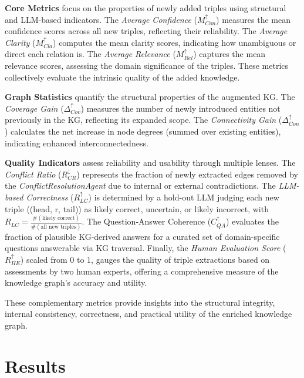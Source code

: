 \documentclass{article}
\begin{document}
\noindent\textbf{Core Metrics} focus on the properties of newly added triples using structural and LLM-based indicators. The \emph{Average Confidence} ($M_{Con}^\uparrow$) measures the mean confidence scores across all new triples, reflecting their reliability. The \emph{Average Clarity} ($M_{Cla}^\uparrow$) computes the mean clarity scores, indicating how unambiguous or direct each relation is. The \emph{Average Relevance} ($M_{Rel}^\uparrow$) captures the mean relevance scores, assessing the domain significance of the triples. These metrics collectively evaluate the intrinsic quality of the added knowledge.

\noindent\textbf{Graph Statistics} quantify the structural properties of the augmented KG. The \emph{Coverage Gain} ($\Delta_{Cov}^\uparrow$) measures the number of newly introduced entities not previously in the KG, reflecting its expanded scope. The \emph{Connectivity Gain} ($\Delta_{Con}^\uparrow$) calculates the net increase in node degrees (summed over existing entities), indicating enhanced interconnectedness.

\noindent\textbf{Quality Indicators} assess reliability and usability through multiple lenses. The \emph{Conflict Ratio} ($R_{CR}^\downarrow$) represents the fraction of newly extracted edges removed by the \emph{ConflictResolutionAgent} due to internal or external contradictions. The \emph{LLM-based Correctness} ($R_{LC}^\uparrow$) is determined by a hold-out LLM judging each new triple ((head, r, tail)) as likely correct, uncertain, or likely incorrect, with $R_{LC} = \frac{\#(\text{likely correct})}{\#(\text{all new triples})}$. The Question-Answer Coherence ($C_{QA}^\uparrow$) evaluates the fraction of plausible KG-derived answers for a curated set of domain-specific questions answerable via KG traversal. Finally, the \emph{Human Evaluation Score} ($R_{HE}^\uparrow$) scaled from 0 to 1, gauges the quality of triple extractions based on assessments by two human experts, offering a comprehensive measure of the knowledge graph’s accuracy and utility.

These complementary metrics provide insights into the structural integrity, internal consistency, correctness, and practical utility of the enriched knowledge graph.

\section{Results}
\end{document}
